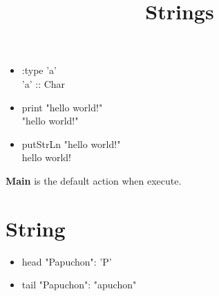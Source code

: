 \documentclass{article}
\title{Strings}
\date{}
\author{}
\begin{document}
\begin{itemize} \renewcommand\labelitemi{\small \textcolor{Lavender}{$\blacksquare$}}
  \item {\selectfont :type 'a'}\\ {\selectfont 'a' :: Char} 
  \item {\selectfont print "hello world!"}\\ {\selectfont "hello world!"}
  \item {\selectfont putStrLn "hello world!"} \\ {\selectfont hello world!}
\end{itemize}

\textbf{Main} is the default action when execute.

\section{String}
\begin{itemize} \renewcommand\labelitemi{\small \textcolor{Lavender}{$\blacksquare$}}
   \item {\selectfont head "Papuchon": 'P'} 
   \item {\selectfont tail "Papuchon": "apuchon"}
\end{itemize}


    
\end{document}
